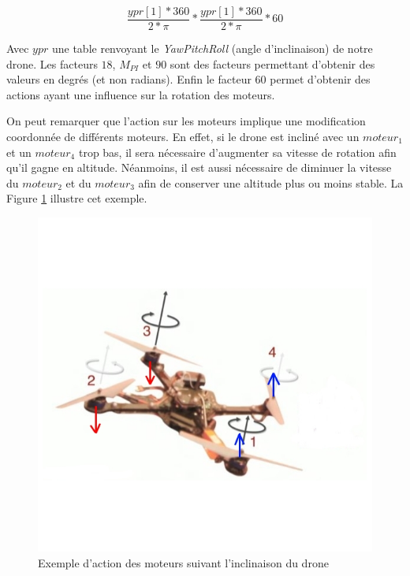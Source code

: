 \documentclass[a4paper,10pt]{report}
\begin{document}
	  \begin{equation}
	    \frac{ypr[1] * 360}{2*\pi} * \frac{ypr[1] * 360}{2*\pi} * 60
	  \end{equation}

	  Avec $ypr$ une table renvoyant le \textit{YawPitchRoll} (angle 
d'inclinaison) de notre drone. Les facteurs $18$, $M_{PI}$ et $90$ sont des 
facteurs permettant d'obtenir des valeurs en degrés (et non radians). Enfin le 
facteur $60$ permet d'obtenir des actions ayant une influence sur la rotation 
des moteurs. 

	  On peut remarquer que l'action sur les moteurs implique une 
modification coordonnée de différents moteurs. En effet, si le drone est 
incliné 
avec un $moteur_1$ et un $moteur_4$ trop bas, il sera nécessaire d'augmenter sa 
vitesse de rotation afin qu'il gagne en altitude. Néanmoins, il est aussi 
nécessaire de diminuer la vitesse du $moteur_2$ et du $moteur_3$ afin de 
conserver une altitude plus ou moins stable. La Figure \ref{inclinaisondrone} 
illustre cet exemple.

	  \begin{figure}[htbp]
	    \centering
	    \includegraphics[scale = 0.5]{img/quadcopter.jpg}
	    \caption{Exemple d'action des moteurs suivant l'inclinaison du 
drone}
	    \label{inclinaisondrone}
	  \end{figure}
\end{document}

